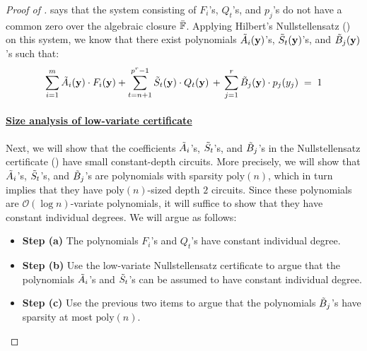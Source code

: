 \documentclass[11pt]{article}
\newcommand{\bigO}{\mathcal{O}}
\newcommand{\F}{\mathbb{F}}
\begin{document}
\begin{proof}[Proof of ]
\noindent
{} says that the system consisting of $F_{i}$'s, $Q_{t}$'s, and $p_{j}$'s do not have a common zero over the algebraic closure $\Bar{\F}$. Applying Hilbert's Nullstellensatz () on this system, we know that there exist polynomials $\Tilde{A}_{i}(\mathbf{y})$'s, $\Tilde{S}_{t}(\mathbf{y})$'s, and $\Tilde{B}_{j}(\mathbf{y})$'s such that:
\begin{equation}\label{eqn:ubd-sym-constant-null}
    \sum_{i=1}^{m} \Tilde{A}_{i}(\mathbf{y}) \cdot F_{i}(\mathbf{y}) + \sum_{t=n+1}^{p^{r}-1} \Tilde{S}_{t}(\mathbf{y}) \cdot Q_{t}(\mathbf{y}) \, + \, \sum_{j=1}^{r} \Tilde{B}_{j}(\mathbf{y}) \cdot p_{j}(y_{j}) \; = \; 1
\end{equation}

\paragraph{\underline{Size analysis of low-variate certificate}}Next, we will show that the coefficients $\Tilde{A}_{i}$'s, $\Tilde{S}_{t}$'s, and $\Tilde{B}_{j}$'s in the Nullstellensatz certificate () have small constant-depth circuits. More precisely, we will show that $\Tilde{A}_{i}$'s, $\Tilde{S}_{t}$'s, and $\Tilde{B}_{j}$'s are polynomials with sparsity $\mathrm{poly}(n)$, which in turn implies that they have $\mathrm{poly}(n)$-sized depth $2$ circuits. Since these polynomials are $\bigO(\log n)$-variate polynomials, it will suffice to show that they have constant individual degrees. We will argue as follows:
\begin{itemize}
    \item \textbf{Step (a)} The polynomials $F_{i}$'s and $Q_{t}$'s have constant individual degree.
    \item \textbf{Step (b)} Use the low-variate Nullstellensatz certificate  to argue that the polynomials $\Tilde{A}_{i}$'s and $\Tilde{S}_{t}$'s can be assumed to have constant individual degree.
    \item \textbf{Step (c)} Use the previous two items to argue that the polynomials $\Tilde{B}_{j}$'s have sparsity at most $\mathrm{poly}(n)$.
\end{itemize}



\end{proof}
\end{document}
